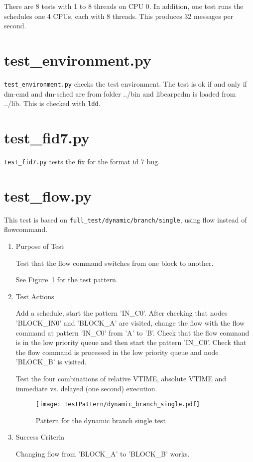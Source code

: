 \documentclass[12pt,a4paper]{report}
\begin{document}
There are 8 tests with 1 to 8 threads on CPU 0. In addition, one test runs the schedules one 4 CPUs, each with 8 threads. This
produces 32 messages per second.

\section{test\_environment.py}
\texttt{test\_environment.py} checks the test environment. The test is ok if and only if dm-cmd and dm-sched are
from folder ../bin and libcarpedm is loaded from ../lib. This is checked with \texttt{ldd}.

\section{test\_fid7.py}
\texttt{test\_fid7.py} tests the fix for the format id 7 bug.

\section{test\_flow.py}
This test is based on \texttt{full\_test/dynamic/branch/single}, using flow instead of flowcommand.
\begin{enumerate}
  \item Purpose of Test

  Test that the flow command switches from one block to another.

  See Figure~\ref{fig:Pattern_for_the_dynamic_branch_single_test} for the test pattern.
  \item Test Actions

  Add a schedule, start the pattern 'IN\_C0'. After checking that nodes 'BLOCK\_IN0' and 'BLOCK\_A' are visited,
        change the flow with the flow command at pattern 'IN\_C0' from 'A' to 'B'. Check that the flow
        command is in the low priority queue and then start the pattern 'IN\_C0'. Check that the flow
        command is processed in the low priority queue and node 'BLOCK\_B' is visited.

  Test the four combinations of relative VTIME, absolute VTIME and immediate vs. delayed (one second) execution.
    \begin{figure}
        \centering
        \texttt{[image: TestPattern/dynamic\_branch\_single.pdf]}
        \caption{Pattern for the dynamic branch single test}
        \label{fig:Pattern_for_the_dynamic_branch_single_test}
    \end{figure}
  \item Success Criteria

  Changing flow from 'BLOCK\_A' to 'BLOCK\_B' works.
\end{enumerate}
\end{document}

